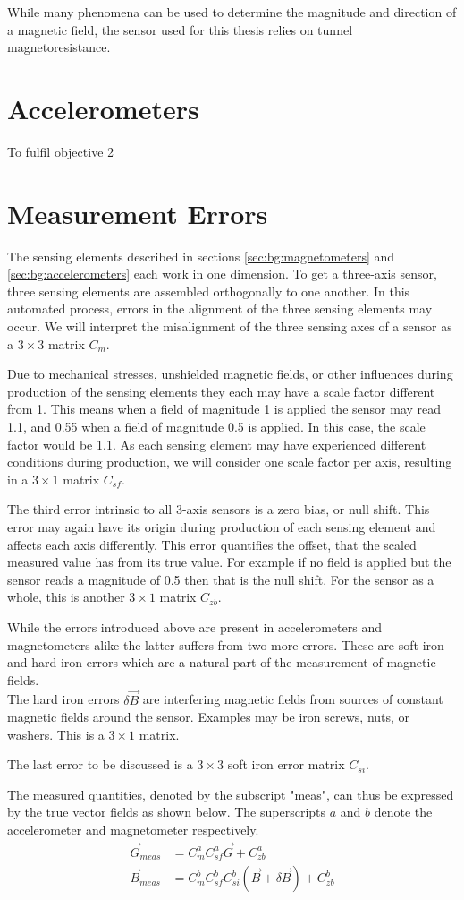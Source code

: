 While many phenomena can be used to determine the magnitude and direction of a magnetic field, the sensor used for this thesis relies on tunnel magnetoresistance.

\section{Accelerometers \label{sec:bg:accelerometers}}
To fulfil objective 2

\section{Measurement Errors \label{sec:bg:measurement_errors}}
The sensing elements described in sections \ref{sec:bg:magnetometers} and \ref{sec:bg:accelerometers} each work in one dimension. To get a three-axis sensor, three sensing elements are assembled orthogonally to one another. In this automated process, errors in the alignment of the three sensing elements may occur. We will interpret the misalignment of the three sensing axes of a sensor as a $3\times3$ matrix $C_{m}$.

Due to mechanical stresses, unshielded magnetic fields, or other influences during production of the sensing elements they each may have a scale factor different from 1. This means when a field of magnitude 1 is applied the sensor may read 1.1, and 0.55 when a field of magnitude 0.5 is applied. In this case, the scale factor would be 1.1. As each sensing element may have experienced different conditions during production, we will consider one scale factor per axis, resulting in a $3\times1$ matrix $C_{sf}$.

The third error intrinsic to all 3-axis sensors is a zero bias, or null shift. This error may again have its origin during production of each sensing element and affects each axis differently. This error quantifies the offset, that the scaled measured value has from its true value. For example if no field is applied but the sensor reads a magnitude of 0.5 then that is the null shift. For the sensor as a whole, this is another $3\times1$ matrix $C_{zb}$.

While the errors introduced above are present in accelerometers and magnetometers alike the latter suffers from two more errors. These are soft iron and hard iron errors which are a natural part of the measurement of magnetic fields.\\
The hard iron errors $\delta\vec{B}$ are interfering magnetic fields from sources of constant magnetic fields around the sensor. Examples may be iron screws, nuts, or washers. This is a $3\times1$ matrix.

The last error to be discussed is a $3\times3$ soft iron error matrix $C_{si}$.

The measured quantities, denoted by the subscript "meas", can thus be expressed by the true vector fields as shown below. The superscripts $a$ and $b$ denote the accelerometer and magnetometer respectively.
\begin{align}
    \vec{G}_{meas}&=C^a_mC^a_{sf}\vec G+C_{zb}^a \\
    \vec{B}_{meas}&=C^b_mC^b_{sf}C^b_{si}(\vec{B}+\delta\vec{B})+C_{zb}^b
\end{align}